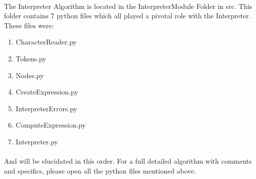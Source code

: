         \paragraph{}
        The Interpreter Algorithm is located in the InterpreterModule Folder in src. This folder contains 7 python files which all played a pivotal role with the Interpreter. These files were:

        \begin{enumerate}
            \item CharacterReader.py
            \item Tokens.py
            \item Nodes.py
            \item CreateExpression.py
            \item InterpreterErrors.py
            \item ComputeExpression.py
            \item Interpreter.py
        \end{enumerate}

        \paragraph{}
        And will be elucidated in this order. For a full detailed algorithm with comments and specifics, please open all the python files mentioned above.

